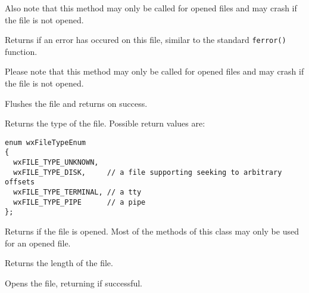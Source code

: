 Also note that this method may only be called for opened files and may crash if
the file is not opened.




\label{wxffileerror}

Returns \true if an error has occured on this file, similar to the standard
\texttt{ferror()} function.

Please note that this method may only be called for opened files and may crash
if the file is not opened.




\label{wxffileflush}


Flushes the file and returns \true on success.


\label{wxffilegetfiletype}


Returns the type of the file. Possible return values are:

\begin{verbatim}
enum wxFileTypeEnum
{
  wxFILE_TYPE_UNKNOWN,
  wxFILE_TYPE_DISK,     // a file supporting seeking to arbitrary offsets
  wxFILE_TYPE_TERMINAL, // a tty
  wxFILE_TYPE_PIPE      // a pipe
};

\end{verbatim}


\label{wxffileisopened}


Returns \true if the file is opened. Most of the methods of this class may only
be used for an opened file.


\label{wxffilelength}


Returns the length of the file.


\label{wxffileopen}


Opens the file, returning \true if successful.

